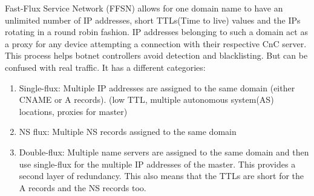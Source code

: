 Fast-Flux Service Network (FFSN) allows for one domain name to have an unlimited number of IP addresses, short TTLs(Time to live) values and the IPs rotating in a round robin fashion. IP addresses belonging to such a domain act as a proxy for any device attempting a connection with their respective
CnC server. This process helps botnet controllers avoid detection and blacklisting. But can be confused with real traffic. It has a different categories:
\begin{enumerate}
\item Single-flux: Multiple IP addresses are assigned to the same domain (either CNAME or A records). (low TTL, multiple autonomous system(AS) locations, proxies for master)
\item NS flux: Multiple NS records assigned to the same domain
\item Double-flux: Multiple name servers are assigned to the same domain and then use single-flux for the multiple IP addresses of the master. This provides a second layer of redundancy. This also means that the TTLs are short for the A records and the NS records too.
\end{enumerate}

